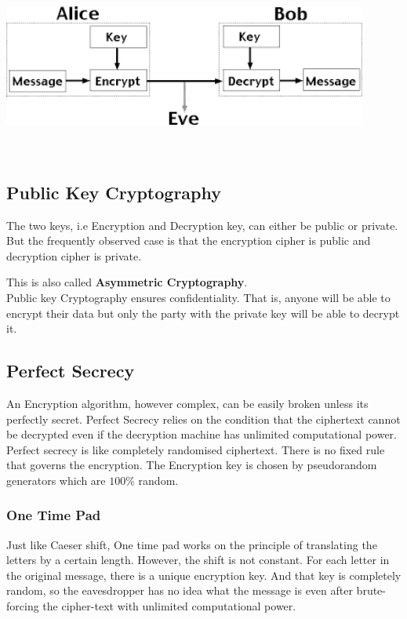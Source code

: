 \documentclass[12pt,a4paper]{extarticle}
\begin{document}
\begin{center}
	\includegraphics[width=12cm, height=6cm]{crypto}
\end{center}

\subsection{Public Key Cryptography}
The two keys, i.e Encryption and Decryption key, can either be public or private. But the frequently observed case is that the encryption cipher is public and decryption cipher is private.

This is also called \textbf{Asymmetric Cryptography}. \\

Public key Cryptography ensures confidentiality. That is, anyone will be able to encrypt their data but only the party with the private key will be able to decrypt it. 

\subsection{Perfect Secrecy}
  An Encryption algorithm, however complex, can be easily broken unless its perfectly secret. Perfect Secrecy relies on the condition that the ciphertext cannot be decrypted even if the decryption machine has unlimited computational power. \\
  
Perfect secrecy is like completely randomised ciphertext. There is no fixed rule that governs the encryption. The Encryption key is chosen by pseudorandom generators which are $ 100\% $ random. 

\subsubsection{One Time Pad}
 Just like Caeser shift, One time pad works on the principle of translating the letters by a certain length. However, the shift is not constant. For each letter in the original message, there is a unique encryption key. And that key is completely random, so the eavesdropper has no idea what the message is even after brute-forcing the cipher-text with unlimited computational power.
 
\end{document}
